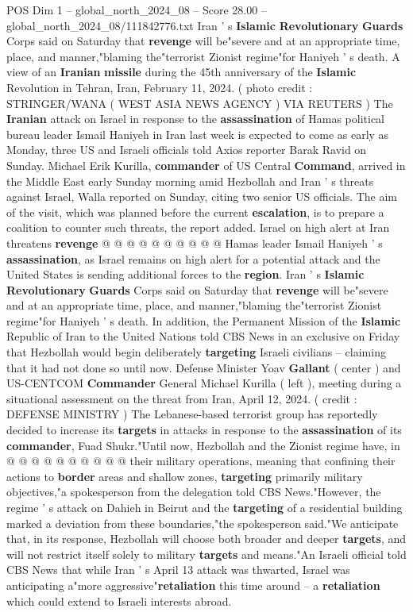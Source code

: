 \begin{textsample}{POS Dim 1 – global\_north\_2024\_08 – Score 28.00 – global\_north\_2024\_08/111842776.txt}  \label{ex:f1_pos_078}
Iran ' s \textbf{Islamic} \textbf{Revolutionary} \textbf{Guards} Corps said on Saturday that \textbf{revenge} will be"severe and at an appropriate time, place, and manner,"blaming the"terrorist Zionist regime"for Haniyeh ' s death.
A view of an \textbf{Iranian} \textbf{missile} during the 45th anniversary of the \textbf{Islamic} Revolution in Tehran, Iran, February 11, 2024. ( photo credit : STRINGER/WANA ( WEST ASIA NEWS AGENCY ) VIA REUTERS ) The \textbf{Iranian} attack on Israel in response to the \textbf{assassination} of Hamas political bureau leader Ismail Haniyeh in Iran last week is expected to come as early as Monday, three US and Israeli officials told Axios reporter Barak Ravid on Sunday.
Michael Erik Kurilla, \textbf{commander} of US Central \textbf{Command}, arrived in the Middle East early Sunday morning amid Hezbollah and Iran ' s threats against Israel, Walla reported on Sunday, citing two senior US officials.
The aim of the visit, which was planned before the current \textbf{escalation}, is to prepare a coalition to counter such threats, the report added.
Israel on high alert at Iran threatens \textbf{revenge} @ @ @ @ @ @ @ @ @ @ Hamas leader Ismail Haniyeh ' s \textbf{assassination}, as Israel remains on high alert for a potential attack and the United States is sending additional forces to the \textbf{region}.
Iran ' s \textbf{Islamic} \textbf{Revolutionary} \textbf{Guards} Corps said on Saturday that \textbf{revenge} will be"severe and at an appropriate time, place, and manner,"blaming the"terrorist Zionist regime"for Haniyeh ' s death.
In addition, the Permanent Mission of the \textbf{Islamic} Republic of Iran to the United Nations told CBS News in an exclusive on Friday that Hezbollah would begin deliberately \textbf{targeting} Israeli civilians -- claiming that it had not done so until now.
Defense Minister Yoav \textbf{Gallant} ( center ) and US-CENTCOM \textbf{Commander} General Michael Kurilla ( left ), meeting during a situational assessment on the threat from Iran, April 12, 2024. ( credit : DEFENSE MINISTRY ) The Lebanese-based terrorist group has reportedly decided to increase its \textbf{targets} in attacks in response to the \textbf{assassination} of its \textbf{commander}, Fuad Shukr."Until now, Hezbollah and the Zionist regime have, in @ @ @ @ @ @ @ @ @ @ their military operations, meaning that confining their actions to \textbf{border} areas and shallow zones, \textbf{targeting} primarily military objectives,"a spokesperson from the delegation told CBS News."However, the regime ' s attack on Dahieh in Beirut and the \textbf{targeting} of a residential building marked a deviation from these boundaries,"the spokesperson said."We anticipate that, in its response, Hezbollah will choose both broader and deeper \textbf{targets}, and will not restrict itself solely to military \textbf{targets} and means."An Israeli official told CBS News that while Iran ' s April 13 attack was thwarted, Israel was anticipating a"more aggressive"\textbf{retaliation} this time around -- a \textbf{retaliation} which could extend to Israeli interests abroad.

\end{textsample}
